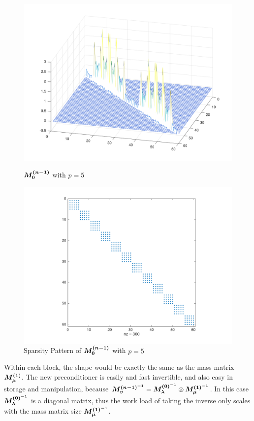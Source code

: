 \begin{figure}[H]
	\includegraphics[width=\linewidth]{full_mass_quad_1p}
	\caption{$\boldsymbol{M_0^{(n-1)}}$ with $p=5$}
	\label{mass_surf}
	\endminipage \hfill
	\includegraphics[width=\linewidth]{mass_spy_1p}
	\caption{Sparsity Pattern of $\boldsymbol{M_0^{(n-1)}}$ with $p=5$}
	\label{mass_spy}
	\endminipage
\end{figure}
Within each block, the shape would be exactly the same as the mass matrix $\boldsymbol{M_{\mu}^{(1)}}$. The new preconditioner is easily and fast invertible, and also easy in storage and manipulation, because $\boldsymbol{M_v^{(n-1)^{-1}}} = \boldsymbol{M_{\lambda}^{(0)^{-1}}} \otimes \boldsymbol{M_{\mu}^{(1)^{-1}}}$. In this case $\boldsymbol{M_{\lambda}^{(0)^{-1}}}$ is a diagonal matrix, thus the work load of taking the inverse only scales with the mass matrix size $\boldsymbol{M_{\mu}^{(1)^{-1}}}$. \\

